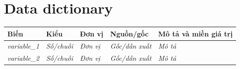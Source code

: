 \chapter{Data dictionary}
\label{app:data-dictionary}

\begin{longtable}{p{}p{}p{}p{}p{}}
\toprule
\textbf{Biến} & \textbf{Kiểu} & \textbf{Đơn vị} & \textbf{Nguồn/gốc} & \textbf{Mô tả và miền giá trị} \\
\midrule
\textit{variable\_1} & \textit{Số/chuỗi} & \textit{Đơn vị} & \textit{Gốc/dẫn xuất} & \textit{Mô tả} \\
\textit{variable\_2} & \textit{Số/chuỗi} & \textit{Đơn vị} & \textit{Gốc/dẫn xuất} & \textit{Mô tả} \\
\bottomrule
\end{longtable}
